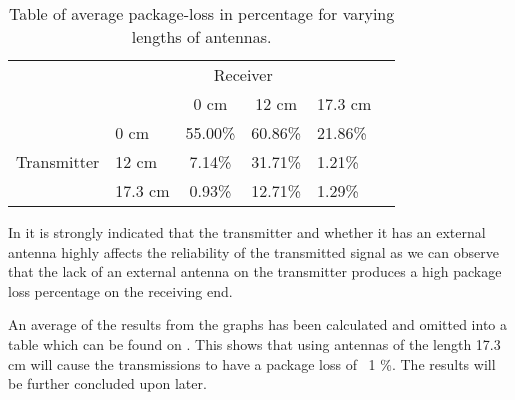 \begin{table}[ht]
\centering
\caption{Table of average package-loss in percentage for varying lengths of antennas.}
\label{tbl:packageloss}
\begin{tabular}{llclll}
 & \multicolumn{4}{c}{Receiver} &    \hspace{40pt}      \\ \cline{2-5}
\multicolumn{1}{l|}{} & \multicolumn{1}{l|}{} & \multicolumn{1}{c|}{0 cm} & \multicolumn{1}{c|}{12 cm} & \multicolumn{1}{l|}{17.3 cm} &  \\ \cline{2-5}
\multicolumn{1}{l|}{} & \multicolumn{1}{l|}{0 cm} & \multicolumn{1}{c|}{55.00\%} & \multicolumn{1}{l|}{60.86\%} & \multicolumn{1}{l|}{21.86\%} &  \\ \cline{2-5}
\multicolumn{1}{l|}{Transmitter} & \multicolumn{1}{l|}{12 cm} & \multicolumn{1}{c|}{7.14\%} & \multicolumn{1}{l|}{31.71\%} & \multicolumn{1}{l|}{1.21\%} &  \\ \cline{2-5}
\multicolumn{1}{l|}{} & \multicolumn{1}{l|}{17.3 cm} & \multicolumn{1}{c|}{0.93\%} & \multicolumn{1}{l|}{12.71\%} & \multicolumn{1}{l|}{1.29\%} &  \\ \cline{2-5}
\end{tabular}
\end{table}

In  it is strongly indicated that the transmitter and whether it has an external antenna highly affects the reliability of the transmitted signal as we can observe that the lack of an external antenna on the transmitter produces a high package loss percentage on the receiving end.

An average of the results from the graphs has been calculated and omitted into a table which can be found on . 
This shows that using antennas of the length 17.3 cm will cause the transmissions to have a package loss of ~1 \%.
The results will be further concluded upon later.

